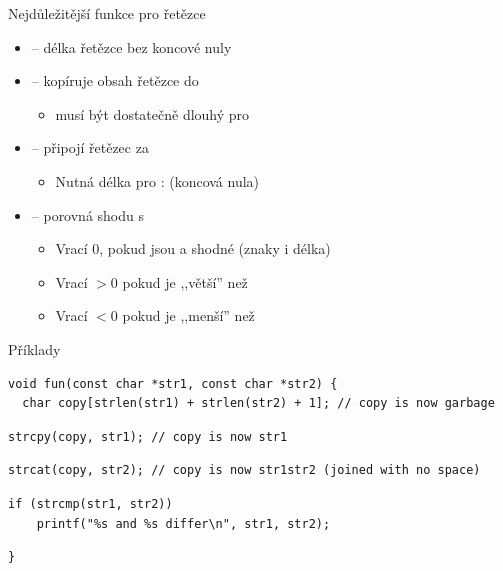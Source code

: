 \begin{frame}[fragile]{Nejdůležitější funkce pro řetězce}

  \begin{itemize}
    \item {} -- délka řetězce  bez koncové nuly

    \pause

    \item {} -- kopíruje obsah řetězce  do 
    \begin{itemize}
      \item {} musí být dostatečně dlouhý pro 
    \end{itemize}

    \pause

    \item {} -- připojí řetězec  za 
    \begin{itemize}
      \item Nutná délka pro :  (koncová
        nula)
    \end{itemize}

    \pause

    \item {} -- porovná shodu  s 
    \begin{itemize}
      \item Vrací $0$, pokud jsou  a  shodné (znaky i délka)
      \item Vrací $>0$ pokud je  ,,větší'' než 
      \item Vrací $<0$ pokud je  ,,menší'' než 
    \end{itemize}

  \end{itemize}


  \begin{block}{Příklady}
\begin{lstlisting}[belowskip=0pt]
void fun(const char *str1, const char *str2) {
  char copy[strlen(str1) + strlen(str2) + 1]; // copy is now garbage
\end{lstlisting}
\begin{lstlisting}[belowskip=0pt,aboveskip=0pt]
  strcpy(copy, str1); // copy is now str1
\end{lstlisting}
\begin{lstlisting}[belowskip=0pt,aboveskip=0pt]
  strcat(copy, str2); // copy is now str1str2 (joined with no space)
\end{lstlisting}
\begin{lstlisting}[belowskip=0pt,aboveskip=0pt]
  if (strcmp(str1, str2))
    printf("%s and %s differ\n", str1, str2);
\end{lstlisting}
\begin{lstlisting}[aboveskip=0pt]
}
\end{lstlisting}
  \end{block}

\end{frame}


